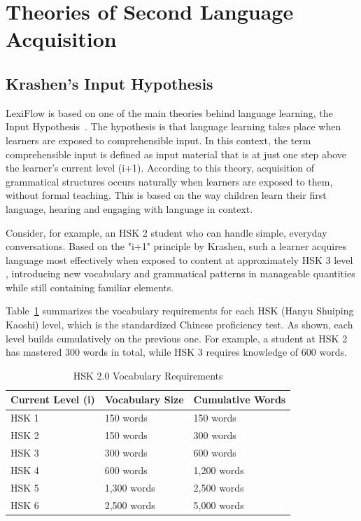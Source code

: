 \documentclass[oneside]{utmthesis}
\begin{document}
\section{Theories of Second Language Acquisition}
\subsection{Krashen's Input Hypothesis}
LexiFlow is based on one of the main theories behind language learning, the Input Hypothesis~\citep{krashen1985}. The hypothesis is that language learning takes place when learners are exposed to comprehensible input. In this context, the term comprehensible input is defined as input material that is at just one step above the learner's current level (i+1). According to this theory, acquisition of grammatical structures occurs naturally when learners are exposed to them, without formal teaching. This is based on the way children learn their first language, hearing and engaging with language in context.

Consider, for example, an HSK 2 student who can handle simple, everyday conversations. Based on the "i+1" principle by Krashen, such a learner acquires language most effectively when exposed to content at approximately HSK 3 level , introducing new vocabulary and grammatical patterns in manageable quantities while still containing familiar elements.

    {Table~{\ref{tab:hsk2}}} summarizes the vocabulary requirements for each HSK (Hanyu Shuiping Kaoshi) level, which is the standardized Chinese proficiency test. As shown, each level builds cumulatively on the previous one. For example, a student at HSK 2 has mastered 300 words in total, while HSK 3 requires knowledge of 600 words.

\begin{table}[h]
    \centering
    \caption{HSK 2.0 Vocabulary Requirements \citep{hsk2}}\label{tab:hsk2}
    \begin{tabular}{@{}lll@{}}
        \toprule
        \textbf{Current Level (i)} & \textbf{Vocabulary Size} & \textbf{Cumulative Words} \\
        \midrule
        HSK 1                      & 150 words                & 150 words                 \\
        HSK 2                      & 150 words                & 300 words                 \\
        HSK 3                      & 300 words                & 600 words                 \\
        HSK 4                      & 600 words                & 1,200 words               \\
        HSK 5                      & 1,300 words              & 2,500 words               \\
        HSK 6                      & 2,500 words              & 5,000 words               \\
        \bottomrule
    \end{tabular}
    \smallskip

\end{table}
\end{document}
